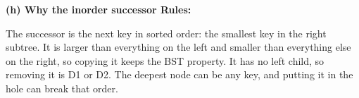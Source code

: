 \documentclass[10pt]{article}
\newcommand{\casehead}[2]{%
  \par\vspace{3pt}\needspace{16mm}%
  \noindent\colorbox{barc}{\parbox{\dimexpr\linewidth-2\fboxsep}{\bfseries\color{headc}#1%
    \if\relax\detokenize{#2}\relax\else\hfill{\mdseries Rules: #2}\fi}}\par\vspace{1pt}}
\begin{document}
\casehead{(h) Why the inorder successor}{}
The successor is the next key in sorted order: the smallest key in the right subtree. It is larger than everything on the left and smaller than everything else on the right, so copying it keeps the BST property. It has no left child, so removing it is D1 or D2. The deepest node can be any key, and putting it in the hole can break that order.
\end{document}
